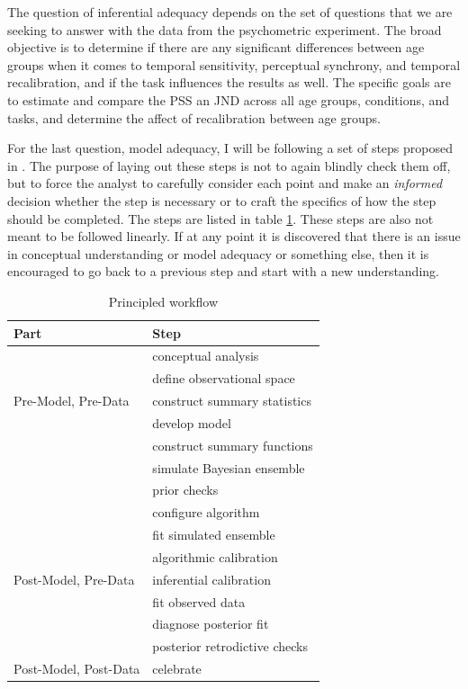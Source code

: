 \documentclass[11pt, oneside, openany]{scrbook}
\begin{document}
The question of inferential adequacy depends on the set of questions that we are seeking to answer with the data from the psychometric experiment. The broad objective is to determine if there are any significant differences between age groups when it comes to temporal sensitivity, perceptual synchrony, and temporal recalibration, and if the task influences the results as well. The specific goals are to estimate and compare the PSS an JND across all age groups, conditions, and tasks, and determine the affect of recalibration between age groups.

For the last question, model adequacy, I will be following a set of steps proposed in \citet{betancourt2020}. The purpose of laying out these steps is not to again blindly check them off, but to force the analyst to carefully consider each point and make an \emph{informed} decision whether the step is necessary or to craft the specifics of how the step should be completed. The steps are listed in table \ref{tab:ch030-workflow-steps}. These steps are also not meant to be followed linearly. If at any point it is discovered that there is an issue in conceptual understanding or model adequacy or something else, then it is encouraged to go back to a previous step and start with a new understanding.

\begin{table}[!h]

\caption{\label{tab:ch030-workflow-steps}Principled workflow}
\centering
\begin{tabular}[t]{ll}
\toprule
Part & Step\\
\midrule
 & conceptual analysis\\
\cmidrule{2-2}
 & define observational space\\
\cmidrule{2-2}
\multirow[t]{-3}{*}{\raggedright\arraybackslash Pre-Model, Pre-Data} & construct summary statistics\\
\cmidrule{1-2}
 & develop model\\
\cmidrule{2-2}
 & construct summary functions\\
\cmidrule{2-2}
 & simulate Bayesian ensemble\\
\cmidrule{2-2}
 & prior checks\\
\cmidrule{2-2}
 & configure algorithm\\
\cmidrule{2-2}
 & fit simulated ensemble\\
\cmidrule{2-2}
 & algorithmic calibration\\
\cmidrule{2-2}
\multirow[t]{-8}{*}{\raggedright\arraybackslash Post-Model, Pre-Data} & inferential calibration\\
\cmidrule{1-2}
 & fit observed data\\
\cmidrule{2-2}
 & diagnose posterior fit\\
\cmidrule{2-2}
 & posterior retrodictive checks\\
\cmidrule{2-2}
\multirow[t]{-4}{*}{\raggedright\arraybackslash Post-Model, Post-Data} & celebrate\\
\bottomrule
\end{tabular}
\end{table}
\end{document}
